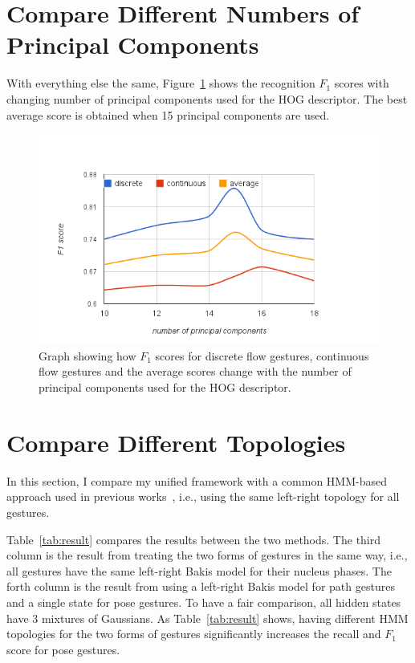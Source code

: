 \section{Compare Different Numbers of Principal Components}
With everything else the same, Figure~\ref{fig:pca} shows the recognition $F_1$
scores with changing number of principal components used for the HOG
descriptor.
The best average score is obtained when 15 principal components are used.

\begin{figure}[tbh]
\centering
\includegraphics[width=\columnwidth]{figures/f1_pca.png}
\caption{Graph showing how $F_1$ scores for discrete flow gestures, continuous
flow gestures and the average scores change with the number of principal
components used for the HOG descriptor.}
\label{fig:pca}
\end{figure}

\section{Compare Different Topologies}
In this section, I compare my unified framework with a common HMM-based approach
used in previous works~\cite{sharma00, Starner95}, i.e., using the same
left-right topology for all gestures.

Table~\ref{tab:result} compares the results between the two methods.
The third column is the result from treating the two forms of gestures in the
same way, i.e., all gestures have the same left-right Bakis model for their nucleus
phases. The forth column is the result from using a left-right Bakis model for
path gestures and a single state for pose gestures. To have a fair comparison,
all hidden states have 3 mixtures of Gaussians. As Table~\ref{tab:result}
shows, having different HMM topologies for the two forms of gestures significantly increases the recall and $F_1$ score
for pose gestures.

